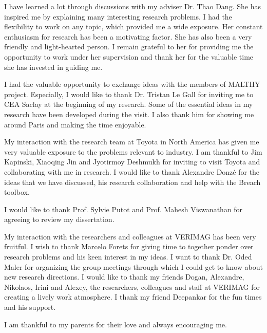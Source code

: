 I have learned a lot through discussions with my adviser Dr. Thao
Dang.  She has inspired me by explaining many interesting research
problems.  I had the flexibility to work on any topic, which provided
me a wide exposure.  Her constant enthusiasm for research has been a
motivating factor.  She has also been a very friendly and
light-hearted person.  I remain grateful to her for providing me the
opportunity to work under her supervision and thank her for the
valuable time she has invested in guiding me.

I had the valuable opportunity to exchange ideas with the members of
MALTHY project.  Especially, I would like to thank Dr. Tristan Le Gall
for inviting me to CEA Saclay at the beginning of my research.
Some of the essential ideas in my research have been developed during
the visit.  I also thank him for showing me around Paris and making
the time enjoyable.

My interaction with the research team at Toyota in North America has
given me very valuable exposure to the problems relevant to industry.
I am thankful to Jim Kapinski, Xiaoqing Jin and Jyotirmoy Deshmukh for
inviting to visit Toyota and collaborating with me in research.  I
would like to thank Alexandre Donz\'e for the ideas that we have
discussed, his research collaboration and help with the Breach
toolbox.

I would like to thank Prof. Sylvie Putot and Prof. Mahesh Viswanathan
for agreeing to review my dissertation.

My interaction with the researchers and colleagues at VERIMAG has been
very fruitful.  I wish to thank Marcelo Forets for giving time to
together ponder over research problems and his keen interest in my
ideas.  I want to thank Dr. Oded Maler for organizing the group
meetings through which I could get to know about new research
directions.  I would like to thank my friends Dogan, Alexandre,
Nikolaos, Irini and Alexey, the researchers, colleagues and staff at
VERIMAG for creating a lively work atmosphere.  I thank my friend
Deepankar for the fun times and his support.


I am thankful to my parents for their love and always encouraging me.
